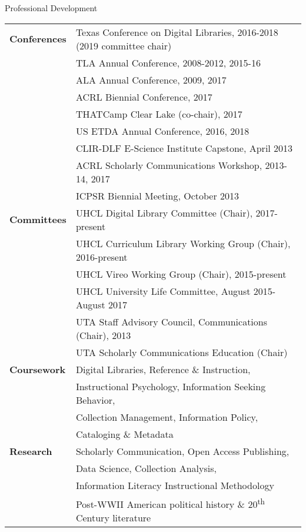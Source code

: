 \documentclass{resume} %
\begin{document}
\begin{rSection}{Professional Development}

\begin{tabular}{ @{} >{\bfseries}l @{\hspace{11ex}} l }
Conferences & Texas Conference on Digital Libraries, 2016-2018 (2019 committee chair) \\
	 & TLA Annual Conference, 2008-2012, 2015-16 \\
	 & ALA Annual Conference, 2009, 2017 \\
	 & ACRL Biennial Conference, 2017 \\
	 & THATCamp Clear Lake (co-chair), 2017 \\
	 & US ETDA Annual Conference, 2016, 2018 \\
	 & CLIR-DLF E-Science Institute Capstone, April 2013 \\
	 & ACRL Scholarly Communications Workshop, 2013-14, 2017 \\
	 & ICPSR Biennial Meeting, October 2013 \\
Committees & UHCL Digital Library Committee (Chair), 2017-present \\
	& UHCL Curriculum Library Working Group (Chair), 2016-present \\
	& UHCL Vireo Working Group (Chair), 2015-present \\
	& UHCL University Life Committee, August 2015-August 2017 \\
	& UTA Staff Advisory Council, Communications (Chair), 2013 \\
	& UTA Scholarly Communications Education (Chair) \\
Coursework & Digital Libraries, Reference \& Instruction, \\
 & Instructional Psychology, Information Seeking Behavior, \\
 & Collection Management, Information Policy, \\
 & Cataloging \& Metadata \\
Research & Scholarly Communication, Open Access Publishing, \\
 & Data Science, Collection Analysis, \\
 & Information Literacy Instructional Methodology \\
 & Post-WWII American political history \& 20\textsuperscript{th} Century literature

\end{tabular}

\end{rSection}
\end{document}
